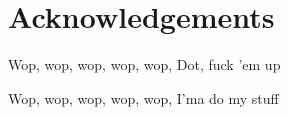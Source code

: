 \section{Acknowledgements}

Wop, wop, wop, wop, wop, Dot, fuck 'em up

Wop, wop, wop, wop, wop, I'ma do my stuff
\cite{Lamar_2024}